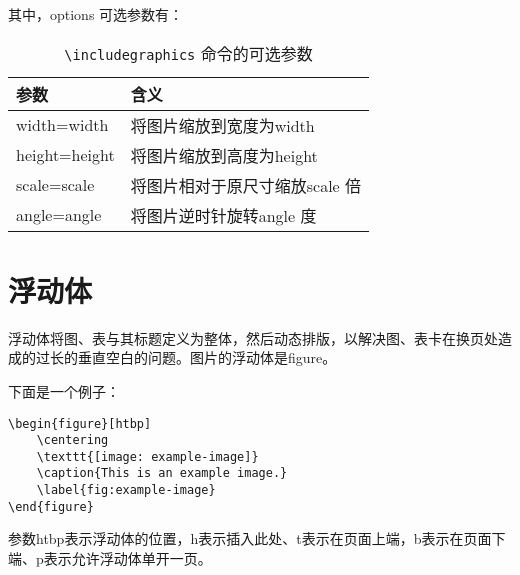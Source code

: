 其中，options 可选参数有：

\begin{table}[htp]
    \centering
    \caption{ \lstinline{\includegraphics} 命令的可选参数}\label{tbl:graphics-options}
    \begin{tabular}{lp{18em}}
        \hline
        \textbf{参数}     & \textbf{含义}          \\
        \hline
        width={width}   & 将图片缩放到宽度为{width}     \\
        height={height} & 将图片缩放到高度为{height}    \\
        scale={scale}   & 将图片相对于原尺寸缩放{scale} 倍 \\
        angle={angle}   & 将图片逆时针旋转{angle} 度    \\
        \hline
    \end{tabular}
\end{table}

\section{浮动体}\label{sec:figure-float}

浮动体将图、表与其标题定义为整体，然后动态排版，以解决图、表卡在换页处造成的过长的垂直空白的问题。图片的浮动体是figure。

下面是一个例子：
\begin{lstlisting}
\begin{figure}[htbp]
    \centering
    \texttt{[image: example-image]}
    \caption{This is an example image.}
    \label{fig:example-image}
\end{figure}
\end{lstlisting}

参数htbp表示浮动体的位置，h表示插入此处、t表示在页面上端，b表示在页面下端、p表示允许浮动体单开一页。
